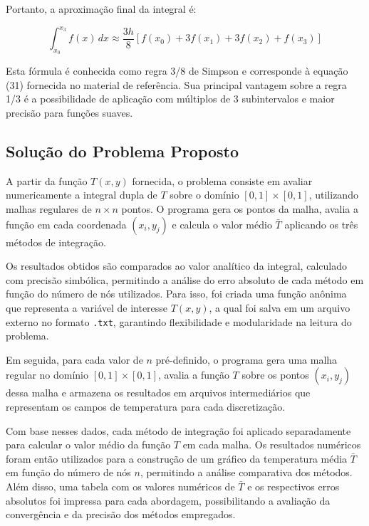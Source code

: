 \documentclass[12pt]{article}
\begin{document}
Portanto, a aproximação final da integral é:

\[
\int_{x_0}^{x_3} f(x)\, dx \approx \frac{3h}{8} \left[ f(x_0) + 3f(x_1) + 3f(x_2) + f(x_3) \right]
\]

Esta fórmula é conhecida como regra 3/8 de Simpson e corresponde à equação (31) fornecida no material de referência. Sua principal vantagem sobre a regra 1/3 é a possibilidade de aplicação com múltiplos de 3 subintervalos e maior precisão para funções suaves.


\subsection{Solução do Problema Proposto}

A partir da função $T(x,y)$ fornecida, o problema consiste em avaliar numericamente a integral dupla de $T$ sobre o domínio $[0,1]\times[0,1]$, utilizando malhas regulares de $n\times n$ pontos. O programa gera os pontos da malha, avalia a função em cada coordenada $(x_i,y_j)$ e calcula o valor médio $\bar{T}$ aplicando os três métodos de integração.

Os resultados obtidos são comparados ao valor analítico da integral, calculado com precisão simbólica, permitindo a análise do erro absoluto de cada método em função do número de nós utilizados. Para isso, foi criada uma função anônima que representa a variável de interesse $T(x,y)$, a qual foi salva em um arquivo externo no formato \texttt{.txt}, garantindo flexibilidade e modularidade na leitura do problema. 

Em seguida, para cada valor de $n$ pré-definido, o programa gera uma malha regular no domínio $[0,1] \times [0,1]$, avalia a função $T$ sobre os pontos $(x_i, y_j)$ dessa malha e armazena os resultados em arquivos intermediários que representam os campos de temperatura para cada discretização.

Com base nesses dados, cada método de integração foi aplicado separadamente para calcular o valor médio da função $T$ em cada malha. Os resultados numéricos foram então utilizados para a construção de um gráfico da temperatura média $\bar{T}$ em função do número de nós $n$, permitindo a análise comparativa dos métodos. Além disso, uma tabela com os valores numéricos de $\bar{T}$ e os respectivos erros absolutos foi impressa para cada abordagem, possibilitando a avaliação da convergência e da precisão dos métodos empregados.
\end{document}
